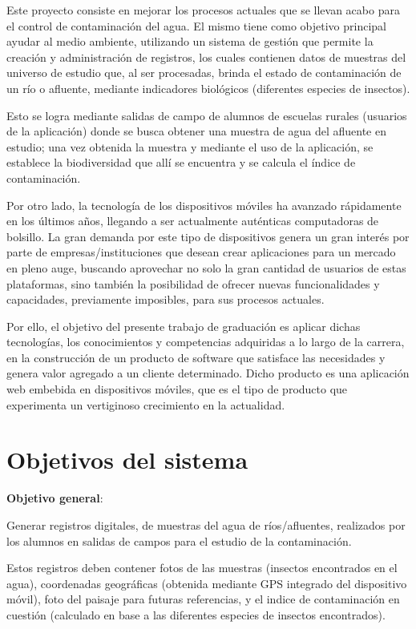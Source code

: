 Este proyecto consiste en mejorar los procesos actuales que se llevan acabo para el control de contaminación del agua. El mismo tiene como objetivo principal ayudar al medio ambiente, utilizando un sistema de gestión que permite la creación y administración de registros, los cuales contienen datos de muestras del universo de estudio que, al ser procesadas, brinda el estado de contaminación de un río o afluente, mediante indicadores biológicos (diferentes especies de insectos). 
 
Esto se logra mediante salidas de campo de alumnos de escuelas rurales (usuarios de la aplicación) donde se busca obtener una muestra de agua del afluente en estudio; una vez obtenida la muestra y mediante el uso de la aplicación, se establece la biodiversidad que allí se encuentra y se calcula el índice de contaminación.

Por otro lado, la tecnología de los dispositivos móviles ha avanzado rápidamente en los últimos años, llegando a ser actualmente auténticas computadoras de bolsillo. La gran demanda por este tipo de dispositivos genera un gran interés por parte de empresas/instituciones que desean crear aplicaciones para un mercado en pleno auge, buscando aprovechar no solo la gran cantidad de usuarios de estas plataformas, sino también la posibilidad de ofrecer nuevas funcionalidades y capacidades, previamente imposibles, para sus procesos actuales.

Por ello, el objetivo del presente trabajo de graduación es aplicar dichas tecnologías, los conocimientos y competencias adquiridas a lo largo de la carrera, en la construcción de un producto de software que satisface las necesidades y genera valor agregado a un cliente determinado. Dicho producto es una aplicación web embebida en dispositivos móviles, que es el tipo de producto que experimenta un vertiginoso crecimiento en la actualidad.  \newpage


\section{Objetivos del sistema}

\textbf{Objetivo general}:
\newline

Generar registros digitales, de muestras del agua de ríos/afluentes, realizados por los alumnos en salidas de campos para el estudio de la contaminación.

Estos registros deben contener fotos de las muestras (insectos encontrados en el agua), coordenadas geográficas (obtenida mediante GPS integrado del dispositivo móvil), foto del paisaje para futuras referencias, y el indice de contaminación en cuestión (calculado en base a las diferentes especies de insectos encontrados).
\newline

